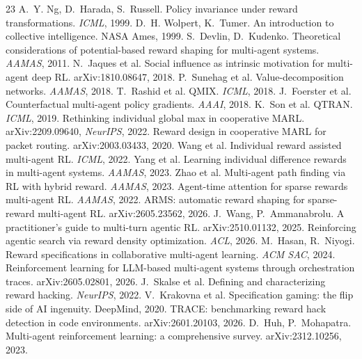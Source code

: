 \documentclass[11pt]{article}
\begin{document}
\begin{thebibliography}{23}
 A.~Y. Ng, D.~Harada, S.~Russell. Policy invariance under reward transformations. \emph{ICML}, 1999.
 D.~H. Wolpert, K.~Tumer. An introduction to collective intelligence. NASA Ames, 1999.
 S.~Devlin, D.~Kudenko. Theoretical considerations of potential-based reward shaping for multi-agent systems. \emph{AAMAS}, 2011.
 N.~Jaques et al. Social influence as intrinsic motivation for multi-agent deep RL. arXiv:1810.08647, 2018.
 P.~Sunehag et al. Value-decomposition networks. \emph{AAMAS}, 2018.
 T.~Rashid et al. QMIX. \emph{ICML}, 2018.
 J.~Foerster et al. Counterfactual multi-agent policy gradients. \emph{AAAI}, 2018.
 K.~Son et al. QTRAN. \emph{ICML}, 2019.
 Rethinking individual global max in cooperative MARL. arXiv:2209.09640, \emph{NeurIPS}, 2022.
 Reward design in cooperative MARL for packet routing. arXiv:2003.03433, 2020.
 Wang et al. Individual reward assisted multi-agent RL. \emph{ICML}, 2022.
 Yang et al. Learning individual difference rewards in multi-agent systems. \emph{AAMAS}, 2023.
 Zhao et al. Multi-agent path finding via RL with hybrid reward. \emph{AAMAS}, 2023.
 Agent-time attention for sparse rewards multi-agent RL. \emph{AAMAS}, 2022.
 ARMS: automatic reward shaping for sparse-reward multi-agent RL. arXiv:2605.23562, 2026.
 J.~Wang, P.~Ammanabrolu. A practitioner's guide to multi-turn agentic RL. arXiv:2510.01132, 2025.
 Reinforcing agentic search via reward density optimization. \emph{ACL}, 2026.
 M.~Hasan, R.~Niyogi. Reward specifications in collaborative multi-agent learning. \emph{ACM SAC}, 2024.
 Reinforcement learning for LLM-based multi-agent systems through orchestration traces. arXiv:2605.02801, 2026.
 J.~Skalse et al. Defining and characterizing reward hacking. \emph{NeurIPS}, 2022.
 V.~Krakovna et al. Specification gaming: the flip side of AI ingenuity. DeepMind, 2020.
 TRACE: benchmarking reward hack detection in code environments. arXiv:2601.20103, 2026.
 D.~Huh, P.~Mohapatra. Multi-agent reinforcement learning: a comprehensive survey. arXiv:2312.10256, 2023.
\end{thebibliography}
\end{document}
